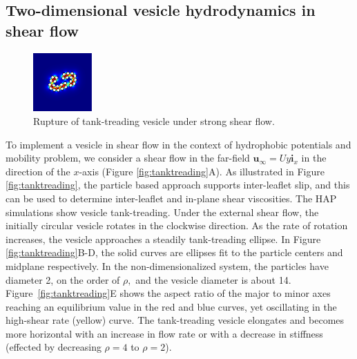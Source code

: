 \subsection{Two-dimensional vesicle hydrodynamics in shear flow} 
%
%
\begin{figure}
\centerline{\includegraphics[width=0.2\textwidth]{figures/PW_fig5.pdf}}
\vspace{-8pt}
\caption{\label{fig:rupture} \footnotesize Rupture of tank-treading vesicle under strong shear flow.}
\end{figure}
%
To implement a vesicle in shear flow in the context of hydrophobic
potentials and mobility problem, we consider a shear flow in the
far-field $\mathbf{u}_{\infty} = Uy\mathbf{i}_x$ in the direction of the
$x$-axis (Figure \ref{fig:tanktreading}A). As illustrated in Figure
\ref{fig:tanktreading}, the particle based approach supports
inter-leaflet slip, and this can be used to determine inter-leaflet and
in-plane shear viscosities. 
%
%
The HAP simulations show vesicle tank-treading. Under the external shear flow, the initially circular 
vesicle rotates in the clockwise direction. As the rate of rotation increases, the vesicle approaches
a steadily tank-treading ellipse. In Figure \ref{fig:tanktreading}B-D, the solid curves are ellipses fit to the particle centers
and midplane respectively. In the non-dimensionalized system, the particles have diameter 2, on the order of $\rho,$ 
and the vesicle diameter is about 14. 
Figure~\ref{fig:tanktreading}E shows the aspect ratio of the major to minor axes reaching an equilibrium value in the 
red and blue curves, yet oscillating in the high-shear rate (yellow) curve.
The tank-treading vesicle elongates and becomes more horizontal 
with an increase in flow rate or 
with a decrease in stiffness (effected by decreasing $\rho = 4$ to $\rho = 2$). 


